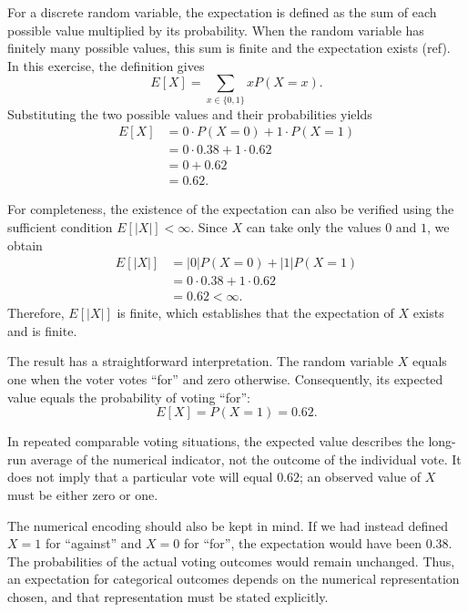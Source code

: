 For a discrete random variable, the expectation is defined as the
sum of each possible value multiplied by its probability. When
the random variable has finitely many possible values, this sum
is finite and the expectation exists (ref). In this exercise, the definition gives
\[
E[X]=\sum_{x\in\{0,1\}}xP(X=x).
\]
Substituting the two possible values and their probabilities yields
\[
\begin{aligned}
E[X]
&=0\cdot P(X=0)+1\cdot P(X=1)\\
&=0\cdot0.38+1\cdot0.62\\
&=0+0.62\\
&=\boxed{0.62}.
\end{aligned}
\]

For completeness, the existence of the expectation can also be
verified using the sufficient condition $E[|X|]<\infty$. Since
$X$ can take only the values $0$ and $1$, we obtain
\[
\begin{aligned}
E[|X|]
&=|0|P(X=0)+|1|P(X=1)\\
&=0\cdot0.38+1\cdot0.62\\
&=0.62<\infty.
\end{aligned}
\]
Therefore, $E[|X|]$ is finite, which establishes that the expectation
of $X$ exists and is finite.

The result has a straightforward interpretation. The random variable
$X$ equals one when the voter votes ``for'' and zero otherwise.
Consequently, its expected value equals the probability of voting
``for'':
\[
E[X]=P(X=1)=0.62.
\]

In repeated comparable voting situations, the expected value describes
the long-run average of the numerical indicator, not the outcome of
the individual vote. It does not imply that a particular vote will
equal $0.62$; an observed value of $X$ must be either zero or one.

The numerical encoding should also be kept in mind. If we had instead
defined $X=1$ for ``against'' and $X=0$ for ``for'', the expectation
would have been $0.38$. The probabilities of the actual voting
outcomes would remain unchanged. Thus, an expectation for categorical
outcomes depends on the numerical representation chosen, and that
representation must be stated explicitly.

\noindent



